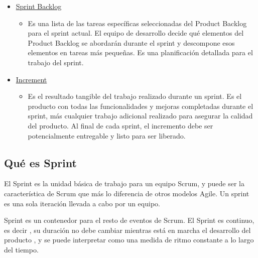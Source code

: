 \documentclass[12pt, letterpaper]{article}
\begin{document}
\begin{enumerate}
\begin{itemize}
            \item \underline{Sprint Backlog}
                \begin{itemize}
                    \item Es una lista de las tareas específicas seleccionadas del Product Backlog para el 
                    sprint actual. El equipo de desarrollo decide qué elementos del Product Backlog se 
                    abordarán durante el sprint y descompone esos elementos en tareas más pequeñas. Es una 
                    planificación detallada para el trabajo del sprint.
                \end{itemize}

            \item \underline{Increment}
                \begin{itemize}
                    \item Es el resultado tangible del trabajo realizado durante un sprint. Es el producto 
                    con todas las funcionalidades y mejoras completadas durante el sprint, más cualquier 
                    trabajo adicional realizado para asegurar la calidad del producto. Al final de cada 
                    sprint, el incremento debe ser potencialmente entregable y listo para ser liberado.
                \end{itemize}

        \end{itemize}
    
\end{enumerate}



\subsection{Qué es Sprint}

El Sprint es la unidad básica de trabajo para un equipo Scrum, y puede ser la característica de Scrum que más 
lo diferencia de otros modelos Agile. Un sprint es una sola iteración llevada a cabo por un equipo.

Sprint es un contenedor para el resto de eventos de Scrum. El Sprint es continuo, es decir , su duración no 
debe cambiar mientras está en marcha el desarrollo del producto , y se puede interpretar como una medida de 
ritmo constante a lo largo del tiempo.

\end{document}

